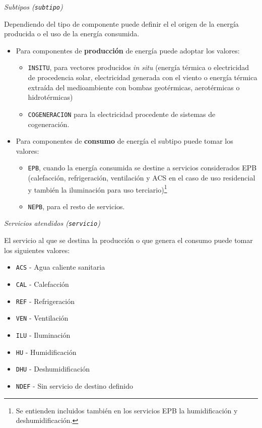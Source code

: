 \documentclass[10pt,notitlepage,oneside,a4paper]{article}
\begin{document}
\textit{Subtipos (\texttt{subtipo})}

Dependiendo del tipo de componente puede definir el el origen de la energía producida o el uso de la energía consumida.

\begin{itemize}
\item Para componentes de \textbf{producción} de energía puede adoptar los valores:
\begin{itemize}
\item \texttt{INSITU}, para vectores producidos \textit{in situ} (energía térmica o electricidad de procedencia solar, electricidad generada con el viento o energía térmica extraída del medioambiente con bombas geotérmicas, aerotérmicas o hidrotérmicas)
\item \texttt{COGENERACION} para la electricidad procedente de sistemas de cogeneración.
\end{itemize} 

\item Para componentes de \textbf{consumo} de energía el subtipo puede tomar los valores:

\begin{itemize}
\item \texttt{EPB}, cuando la energía consumida se destine a servicios considerados EPB (calefacción, refrigeración, ventilación y ACS en el caso de uso residencial y también la iluminación para uso terciario)\footnote{Se entienden incluidos también en los servicios EPB la humidificación y deshumidificación.}
\item \texttt{NEPB}, para el resto de servicios.
\end{itemize}

\end{itemize}

\textit{Servicios atendidos (\texttt{servicio})}

El servicio al que se destina la producción o que genera el consumo puede tomar los siguientes valores:

\begin{itemize}
\item \texttt{ACS} - Agua caliente sanitaria
\item \texttt{CAL} - Calefacción
\item \texttt{REF} - Refrigeración
\item \texttt{VEN} - Ventilación
\item \texttt{ILU} - Iluminación
\item \texttt{HU} - Humidificación
\item \texttt{DHU} - Deshumidificación
\item \texttt{NDEF} - Sin servicio de destino definido
\end{itemize}
\end{document}
